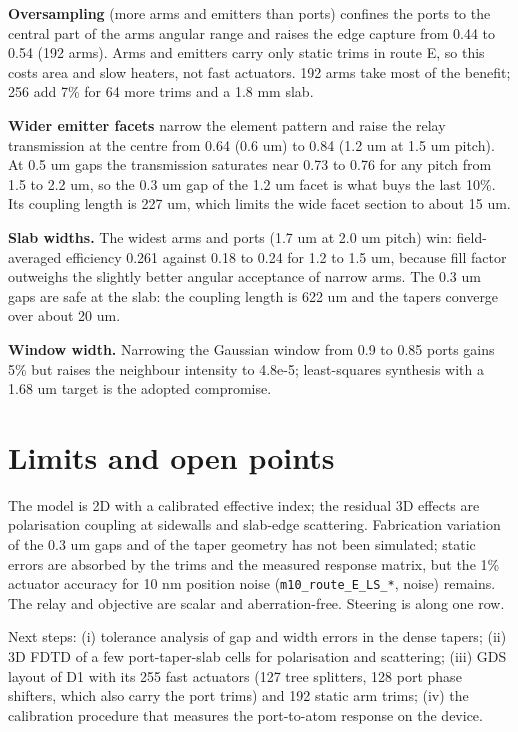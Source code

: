 \textbf{Oversampling} (more arms and emitters than ports) confines the
ports to the central part of the arms\textquotesingle{} angular range
and raises the edge capture from 0.44 to 0.54 (192 arms). Arms and
emitters carry only static trims in route E, so this costs area and slow
heaters, not fast actuators. 192 arms take most of the benefit; 256 add
7\% for 64 more trims and a 1.8 mm slab.

\textbf{Wider emitter facets} narrow the element pattern and raise the
relay transmission at the centre from 0.64 (0.6 um) to 0.84 (1.2 um at
1.5 um pitch). At 0.5 um gaps the transmission saturates near 0.73 to
0.76 for any pitch from 1.5 to 2.2 um, so the 0.3 um gap of the 1.2 um
facet is what buys the last 10\%. Its coupling length is 227 um, which
limits the wide facet section to about 15 um.

\textbf{Slab widths.} The widest arms and ports (1.7 um at 2.0 um pitch)
win: field-averaged efficiency 0.261 against 0.18 to 0.24 for 1.2 to 1.5
um, because fill factor outweighs the slightly better angular acceptance
of narrow arms. The 0.3 um gaps are safe at the slab: the coupling
length is 622 um and the tapers converge over about 20 um.

\textbf{Window width.} Narrowing the Gaussian window from 0.9 to 0.85
ports gains 5\% but raises the neighbour intensity to 4.8e-5;
least-squares synthesis with a 1.68 um target is the adopted compromise.

\hypertarget{5-limits-and-open-points}{%
\section{Limits and open points}\label{fpr_design-5-limits-and-open-points}}

The model is 2D with a calibrated effective index; the residual 3D
effects are polarisation coupling at sidewalls and slab-edge scattering.
Fabrication variation of the 0.3 um gaps and of the taper geometry has
not been simulated; static errors are absorbed by the trims and the
measured response matrix, but the 1\% actuator accuracy for 10 nm
position noise (\texttt{m10\_route\_E\_LS\_*}, noise) remains. The relay
and objective are scalar and aberration-free. Steering is along one row.

Next steps: (i) tolerance analysis of gap and width errors in the dense
tapers; (ii) 3D FDTD of a few port-taper-slab cells for polarisation and
scattering; (iii) GDS layout of D1 with its 255 fast actuators (127 tree
splitters, 128 port phase shifters, which also carry the port trims) and
192 static arm trims; (iv) the calibration procedure that measures the
port-to-atom response on the device.

